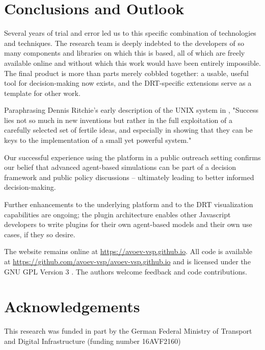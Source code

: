 \documentclass[3p,times,procedia]{elsarticle}
\begin{document}
\section{Conclusions and Outlook}
\label{conclusions}

Several years of trial and error led us to this specific combination of technologies and techniques. The research team is deeply indebted to the developers of so many components and libraries on which this is based, all of which are freely available online and without which this work would have been entirely impossible. The final product is more than parts merely cobbled together: a usable, useful tool for decision-making now exists, and the DRT-specific extensions serve as a template for other work.

Paraphrasing Dennis Ritchie's early description of the UNIX system in \citet{Ritchie1978}, "Success lies not so much in new inventions but rather in the full exploitation of a carefully selected set of fertile ideas, and especially in showing that they can be keys to the implementation of a small yet powerful system."

Our successful experience using the platform in a public outreach setting confirms our belief that advanced agent-based simulations can be part of a decision framework and public policy discussions -- ultimately leading to better informed decision-making.

Further enhancements to the underlying platform and to the DRT visualization capabilities are ongoing; the plugin architecture enables other Javascript developers to write plugins for their own agent-based models and their own use cases, if they so desire.

The website remains online at \url{https://avoev-vsp.github.io}. All code is available at \url{https://github.com/avoev-vsp/avoev-vsp.github.io} and is licensed under the GNU GPL Version 3 \cite{FSF2007GnuGPL}. The authors welcome feedback and code contributions.

\section{Acknowledgements}
This research was funded in part by the German Federal Ministry of Transport and Digital Infrastructure (funding number 16AVF2160)






\end{document}
